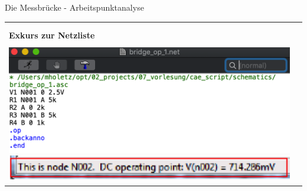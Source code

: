 \begin{frame}[t]{Die Messbrücke - Arbeitspunktanalyse}
\begin{spacing}{0.9}
\begin{tiny}
\begin{table}[h!]
\begin{tabular}{p{3cm} p{7cm}}
\begin{minipage}{.7\textwidth}
\begin{itemize}
            \end{itemize}
          \end{minipage}
          \\
                                        & \\
          \hline
          \textbf{Exkurs zur Netzliste} & \\
          \hline                          \\
          \begin{minipage}{.3\textwidth}
            \includegraphics[width=\linewidth]{pictures/netlist.png}\newline
            \includegraphics[width=\linewidth]{pictures/knotenname.png}
          \end{minipage}
                                        &
          \begin{minipage}{.7\textwidth}


\end{minipage}
\end{tabular}
\end{table}
\end{tiny}
\end{spacing}
\end{frame}
